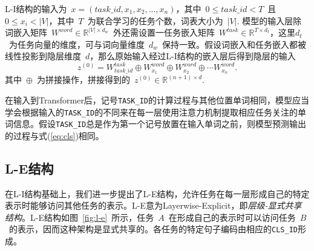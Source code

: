 L-I结构的输入为~$x=(task\_id, x_1, x_2, ..., x_n)$，其中~$0\le task\_id < T$~且~$0 \le x_i < |V|$，其中~$T$~为联合学习的任务个数，词表大小为~$|V|$. 模型的输入层除词嵌入矩阵~$W^{word}\in \mathbb{R}^{|V|\times d_w}$~外还需设置一任务嵌入矩阵~$W^{task}\in \mathbb{R}^{T\times d_{t}}$，这里$d_{t}$~为任务向量的维度，可与词向量维度~$d_w$~保持一致。假设词嵌入和任务嵌入都被线性投影到隐层维度~$d$，那么原始输入经过L-I结构的嵌入层后得到隐层的输入
\begin{equation}
	z^{(0)} = W^{task}_{task\_id} \oplus W^{word}_{x_1} \oplus W^{word}_{x_2} \oplus \cdots W^{word}_{x_n}.
\end{equation}
其中~$\oplus$~为拼接操作，拼接得到的~$z^{(0)}\in \mathbb{R}^{(n+1) \times d}$.

在输入到Transformer后，记号\texttt{TASK\_ID}的计算过程与其他位置单词相同，模型应当学会根据输入的\texttt{TASK\_ID}的不同来在每一层使用注意力机制提取相应任务关注的单词信息。假设\texttt{TASK\_ID}总是作为第一个记号放置在输入单词之前，则模型预测输出的过程与式(\ref{eq:cls})相同。

\subsection{L-E结构}
在L-I结构基础上，我们进一步提出了L-E结构，允许任务在每一层形成自己的特定表示时能够访问其他任务的表示。L-E意为Layerwise-Explicit，即\emph{层级-显式共享结构}。L-E结构如图~\ref{fig:l-e}~所示，任务~$A$~在形成自己的表示时可以访问任务~$B$~的表示，因而这种架构是显式共享的。各任务的特定句子编码由相应的\texttt{CLS\_ID}形成。

